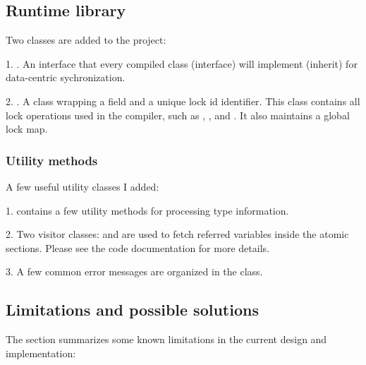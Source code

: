 \documentclass{article}
\begin{document}
\subsection{Runtime library}
\label{sec:runtime}

Two classes are added to the  project:

1. . An interface that every compiled class (interface) will implement (inherit) for data-centric sychronization.

2. . A class wrapping a  field and a unique lock id identifier. This class contains all lock operations used in the compiler, such as , , and . It also maintains a global lock map.

\subsubsection{Utility methods}

A few useful utility classes I added:

1.  contains a few utility methods for processing type information.

2. Two visitor classes:  and
 are used to fetch referred variables inside the atomic sections. Please see the code documentation for more details.

3. A few common error messages are organized in the  class.

\subsection{Limitations and possible solutions}
\label{sec:limitation}

The section summarizes some  known limitations in the current design and implementation:
\end{document}
